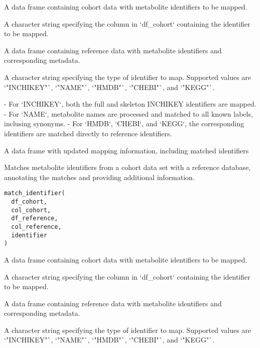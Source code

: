 \documentclass[a4paper]{book}
\begin{document}
%
\begin{Arguments}
\begin{ldescription}
\item[\code{df\_cohort}] A data frame containing cohort data with metabolite identifiers to be mapped.

\item[\code{col\_cohort}] A character string specifying the column in `df\_cohort` containing the identifier to be mapped.

\item[\code{df\_reference}] A data frame containing reference data with metabolite identifiers and corresponding metadata.

\item[\code{identifier}] A character string specifying the type of identifier to map.
Supported values are `"INCHIKEY"`, `"NAME"`, `"HMDB"`, `"CHEBI"`, and `"KEGG"`.
\end{ldescription}
\end{Arguments}
%
\begin{Details}
- For `INCHIKEY`, both the full and skeleton INCHIKEY identifiers are mapped.
- For `NAME`, metabolite names are processed and matched to all known labels, inclusing synonyms.
- For `HMDB`, `CHEBI`, and `KEGG`, the corresponding identifiers are matched directly to reference identifiers.
\end{Details}
%
\begin{Value}
A data frame with updated mapping information, including matched identifiers
\end{Value}
%
\begin{Description}
Matches metabolite identifiers from a cohort data set with a reference database,
annotating the matches and providing additional information.
\end{Description}
%
\begin{Usage}
\begin{verbatim}
match_identifier(
  df_cohort,
  col_cohort,
  df_reference,
  col_reference,
  identifier
)
\end{verbatim}
\end{Usage}
%
\begin{Arguments}
\begin{ldescription}
\item[\code{df\_cohort}] A data frame containing cohort data with metabolite identifiers to be mapped.

\item[\code{col\_cohort}] A character string specifying the column in `df\_cohort` containing the identifier to be mapped.

\item[\code{df\_reference}] A data frame containing reference data with metabolite identifiers and corresponding metadata.

\item[\code{identifier}] A character string specifying the type of identifier to map.
Supported values are `"INCHIKEY"`, `"NAME"`, `"HMDB"`, `"CHEBI"`, and `"KEGG"`.
\end{ldescription}
\end{Arguments}
\end{document}
